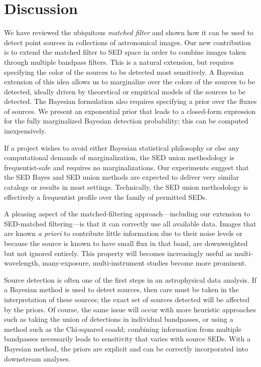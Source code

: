\documentclass[11pt,letterpaper,linenumbers]{aastex7}
\newcommand{\changed}[1]{#1}
\begin{document}
\section{Discussion}
\label{sec:discussion}

We have reviewed the ubiquitous \emph{matched filter} and shown how it
can be used to detect point sources in collections of astronomical
images.  Our new contribution is to extend the matched filter to SED
space in order to combine images taken through multiple bandpass
filters.  This is a natural extension, but requires specifying the
color of the sources to be detected most sensitively.  A Bayesian
extension of this idea allows us to marginalize over the colors of the
sources to be detected, ideally driven by theoretical or empirical
models of the sources to be detected.  The Bayesian formulation also
requires specifying a prior over the fluxes of sources.  We present an
exponential prior that leads to a closed-form expression for the fully
marginalized Bayesian detection probability; this can be computed
inexpensively.

\changed{
If a project wishes to avoid either Bayesian statistical philosophy or else any
computational demands of marginalization, the SED union methodology
is frequentist-safe and requires no marginalizations.
Our experiments suggest that the SED Bayes and SED union methods are
expected to deliver very similar catalogs or results in most settings.
Technically, the SED union methodology is effectively a frequentist profile
over the family of permitted SEDs.
}

A pleasing aspect of the matched-filtering approach---including our
extension to SED-matched filtering---is that it can correctly use all
available data.  Images that are known \emph{a priori} to contribute
little information due to their noise levels or because the source is
known to have small flux in that band, are downweighted but not
ignored entirely.  This property will becomes increasingly useful as
multi-wavelength, many-exposure, multi-instrument studies become more
prominent.


\changed{
Source detection is often one of the first steps in an astrophysical
data analysis.  If a Bayesian method is used to detect sources, then
care must be taken in the interpretation of these sources; the exact
set of sources detected will be affected by the priors.  Of course,
the same issue will occur with more heuristic approaches such as
taking the union of detections in individual bandpasses, or using a
method such as the Chi-squared coadd; combining information from
multiple bandpasses necessarily leads to sensitivity that varies with
source SEDs.  With a Bayesian method, the priors are explicit and can be
correctly incorporated into downstream analyses.
}
\end{document}
